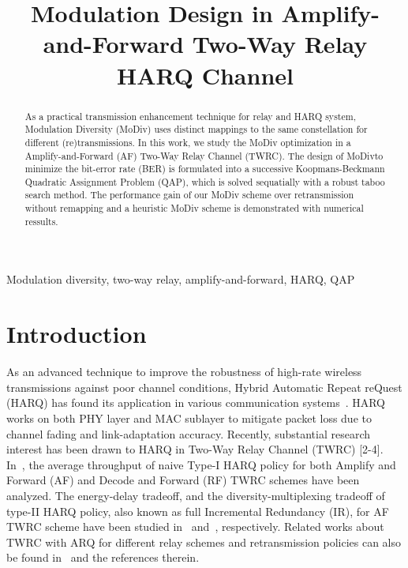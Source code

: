 \documentclass{article}
\title{Modulation Design in Amplify-and-Forward Two-Way Relay HARQ Channel}
\begin{document}
%
\maketitle
%
\begin{abstract}
  As a practical transmission enhancement technique for relay and HARQ system,
  Modulation Diversity (MoDiv) uses distinct mappings to the same constellation
  for different (re)transmissions. 
  In this work, we study the MoDiv optimization
  in a Amplify-and-Forward (AF) Two-Way Relay Channel (TWRC). The design of
  MoDivto minimize the bit-error rate (BER) is formulated into a successive
  Koopmans-Beckmann Quadratic Assignment Problem (QAP), which is solved
  sequatially with a robust taboo search method.
  The performance gain of our MoDiv scheme over retransmission without remapping
  and a heuristic MoDiv scheme is demonstrated with numerical ressults.
\end{abstract}
%
\begin{keywords}
  Modulation diversity, two-way relay, amplify-and-forward, HARQ, QAP
\end{keywords}
%
\section{Introduction}
\label{sec:intro}

As an advanced technique to improve the robustness of high-rate wireless
transmissions against poor channel conditions, Hybrid Automatic Repeat reQuest
(HARQ) has found its application in various communication
systems~\cite{cripriano2010overview}. HARQ works on both PHY layer and MAC
sublayer to mitigate packet loss due to channel fading and
link-adaptation accuracy. Recently, substantial research interest
has been drawn to HARQ in Two-Way Relay Channel
(TWRC) [2-4].
In~\cite{iannello2009throughput}, the average throughput of naive Type-I HARQ
policy for both Amplify and Forward (AF) and Decode and Forward (RF) TWRC schemes have
been analyzed. The energy-delay tradeoff, and the diversity-multiplexing
tradeoff of type-II HARQ policy, also known as full Incremental Redundancy (IR),
for AF TWRC scheme have been studied in~\cite{choi2013energy}
and~\cite{xu2014diversity}, respectively. Related works about TWRC with ARQ
for different relay schemes and retransmission policies can also be
found in~\cite{popovski2007wireless, chen2012arq, guan2015twoway} and the references therein.
\end{document}
